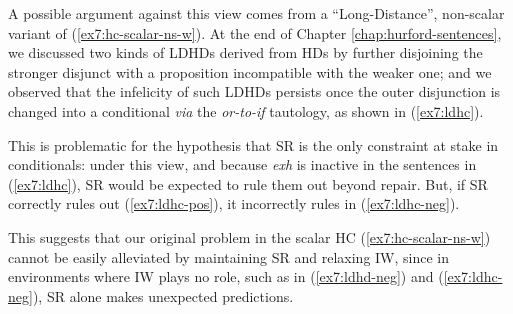 A possible argument against this view comes from a ``Long-Distance'', non-scalar variant of (\ref{ex7:hc-scalar-ns-w}). At the end of Chapter \ref{chap:hurford-sentences}, we discussed two kinds of LDHDs derived from HDs by further disjoining the stronger disjunct with a proposition incompatible with the weaker one; and we observed that the infelicity of such LDHDs persists once the outer disjunction is changed into a conditional \textit{via} the \textit{or-to-if} tautology, as shown in (\ref{ex7:ldhc}).

This is problematic for the hypothesis that SR is the only constraint at stake in conditionals: under this view, and because \textit{exh} is inactive in the sentences in (\ref{ex7:ldhc}), SR would be expected to rule them out beyond repair. But, if SR correctly rules out (\ref{ex7:ldhc-pos}), it incorrectly rules in (\ref{ex7:ldhc-neg}).

\begin{exe}
	\ex \label{ex7:ldhc}
	\begin{xlist}
		\label{ex7:ldhc-pos}
		\label{ex7:ldhc-neg}
	\end{xlist}
\end{exe}

This suggests that our original problem in the scalar HC (\ref{ex7:hc-scalar-ns-w}) cannot be easily alleviated by maintaining SR and relaxing IW, since in environments where IW plays no role, such as in (\ref{ex7:ldhd-neg}) and (\ref{ex7:ldhc-neg}), SR alone makes unexpected predictions.





